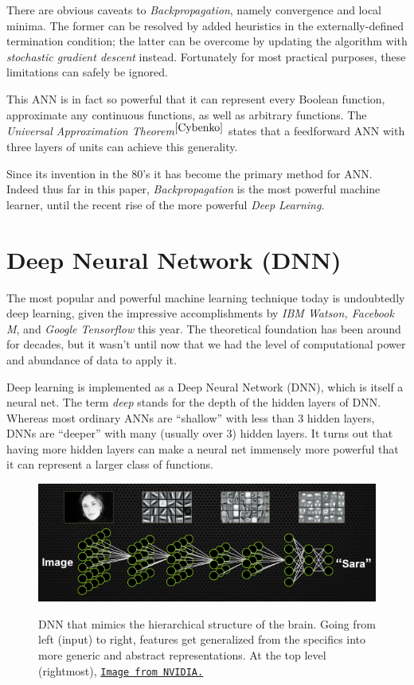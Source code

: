 \documentclass[12pt]{article}  %
\begin{document}
There are obvious caveats to {\em Backpropagation}, namely convergence and local minima. The former can be resolved by added heuristics in the externally-defined termination condition; the latter can be overcome by updating the algorithm with {\em stochastic gradient descent} instead. Fortunately for most practical purposes, these limitations can safely be ignored.

This ANN is in fact so powerful that it can represent every Boolean function, approximate any continuous functions, as well as arbitrary functions. The {\em Universal Approximation Theorem}$^{\ref{Cybenko}}$ states that a feedforward ANN with three layers of units can achieve this generality.

Since its invention in the 80's it has become the primary method for ANN. Indeed thus far in this paper, {\em Backpropagation} is the most powerful machine learner, until the recent rise of the more powerful {\em Deep Learning.}



\section{Deep Neural Network (DNN)}

The most popular and powerful machine learning technique today is undoubtedly deep learning, given the impressive accomplishments by \emph{IBM Watson, Facebook M}, and \emph{Google Tensorflow} this year. The theoretical foundation has been around for decades, but it wasn't until now that we had the level of computational power and abundance of data to apply it.

Deep learning is implemented as a Deep Neural Network (DNN), which is itself a neural net. The term \emph{deep} stands for the depth of the hidden layers of DNN. Whereas most ordinary ANNs are ``shallow'' with less than 3 hidden layers, DNNs are ``deeper'' with many (usually over 3) hidden layers. It turns out that having more hidden layers can make a neural net immensely more powerful that it can represent a larger class of functions.


\begin{figure}[ht]
\centering
\includegraphics[scale=0.9]{images/DNN.png}\\
\caption{DNN that mimics the hierarchical structure of the brain. Going from left (input) to right, features get generalized from the specifics into more generic and abstract representations. At the top level (rightmost),  \href{http://devblogs.nvidia.com/parallelforall/accelerate-machine-learning-cudnn-deep-neural-network-library/}{\tt Image from NVIDIA.}}\label{DNN-fig}
\end{figure}
\end{document}
